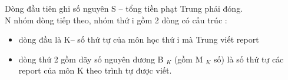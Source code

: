 Dòng đầu tiên ghi số nguyên S – tổng tiền phạt Trung phải đóng.
\\N nhóm dòng tiếp theo, nhóm thứ i gồm 2 dòng có cấu trúc :
\begin{itemize}
	\item dòng đầu là K– số thứ tự của môn học thứ i mà Trung viết report
	\item dòng thứ 2 gồm dãy số nguyên dương B $_ K $ (gồm M $_ K $ số) là số thứ tự các report của môn K theo trình tự được viết.
\end{itemize}

\